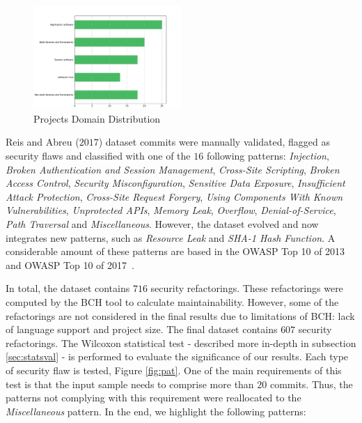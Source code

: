 \documentclass[10pt,conference]{IEEEtran}
\begin{document}
\begin{figure}[h]
 	\centering 	\includegraphics[width=0.5\textwidth]{figures/type_dist.pdf}
 	\caption{Projects Domain Distribution}
	\label{fig:domain}
\end{figure}

Reis and Abreu ($2017$) dataset commits were manually validated, flagged as security flaws and classified with one of the $16$ following patterns: \textit{Injection}, \textit{Broken Authentication and Session Management}, \textit{Cross-Site Scripting}, \textit{Broken Access Control}, \textit{Security Misconfiguration}, \textit{Sensitive Data Exposure}, \textit{Insufficient Attack Protection}, \textit{Cross-Site Request Forgery}, \textit{Using Components With Known Vulnerabilities}, \textit{Unprotected APIs}, \textit{Memory Leak}, \textit{Overflow}, \textit{Denial-of-Service}, \textit{Path Traversal} and \textit{Miscellaneous}. However, the dataset evolved and now integrates new patterns, such as \textit{Resource Leak} and \textit{SHA-1 Hash Function}. A considerable amount of these patterns are based in the OWASP Top 10 of 2013~\cite{oswap:2013} and OWASP Top 10 of 2017~\cite{oswap:2017}.

In total, the dataset contains $716$ security refactorings. These refactorings were computed by the BCH tool to calculate maintainability. However, some of the refactorings are not considered in the final results due to limitations of BCH: lack of language support and project size. The final dataset contains $607$ security refactorings. The Wilcoxon statistical test - described more in-depth in subsection \ref{sec:statsval} - is performed to evaluate the significance of our results. Each type of security flaw is tested, Figure \ref{fig:pat}. One of the main requirements of this test is that the input sample needs to comprise more than $20$ commits. Thus, the patterns not complying with this requirement were reallocated to the \textit{Miscellaneous} pattern. In the end, we highlight the following patterns:
\end{document}

